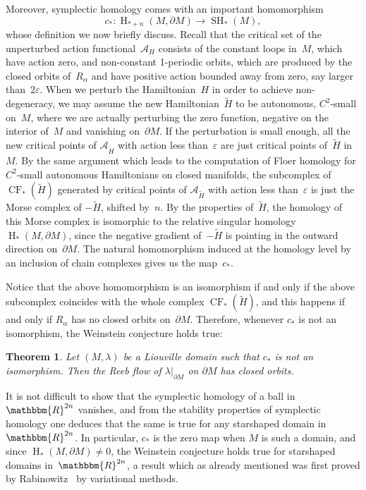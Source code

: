 \documentclass[12pt,twoside]{amsart}
\theoremstyle{plain}
\newtheorem{theorem}{Theorem}[section]
\numberwithin{figure}{section}
\numberwithin{equation}{section}
\def\eps{\varepsilon}
\def\H{\operatorname{H}}
\def\CF{\operatorname{CF}}
\def\SH{\operatorname{SH}}
\def\ca{{\mathcal A}}
\def\RR{\mathbbm{R}}
\begin{document}
Moreover, symplectic homology comes with an important homomorphism
\[
c_* \colon \H_{*+n}(M,\partial M) \rightarrow \SH_*(M),
\]
whose definition we now briefly discuss. Recall that the critical set of the unperturbed action functional~$\ca_H$ consists of the constant loops in~$M$, which have action zero, 
and non-constant 1-periodic orbits, which are produced by the closed orbits of~$R_{\alpha}$ 
and have positive action bounded away from zero, say larger than~$2\eps$. When we perturb the Hamiltonian~$H$ in order to achieve non-degeneracy, we may assume the new Hamiltonian~$\widetilde{H}$ to be autonomous, $C^2$-small on~$M$, 
where we are actually perturbing the zero function, negative on the interior of~$M$ and vanishing on~$\partial M$. If the perturbation is small enough, all the new critical points of $\mathcal{A}_{\widetilde{H}}$ with action less than~$\eps$ 
are just critical points of~$\widetilde{H}$ in~$M$. By the same argument which leads to the computation of 
Floer homology for $C^2$-small autonomous Hamiltonians on closed manifolds, the subcomplex 
of $\CF_*(\widetilde{H})$ generated by critical points of $\mathcal{A}_{\widetilde{H}}$ with action 
less than~$\eps$ is just the Morse complex of $-\widetilde{H}$, shifted by~$n$. 
By the properties of~$\widetilde{H}$, the homology of this Morse complex is isomorphic to the relative singular homology $\H_*(M,\partial M)$, since the negative gradient of~$-\widetilde{H}$ is pointing in the outward direction on~$\partial M$. 
The natural homomorphism induced at the homology level by an inclusion of chain complexes
gives us the map~$c_*$.

Notice that the above homomorphism is an isomorphism if and only if the above subcomplex coincides with the whole complex $\CF_*(\widetilde{H})$, and this happens if and only if 
$R_{\alpha}$ has no closed orbits on~$\partial M$. Therefore, whenever $c_*$ is not an isomorphism, the Weinstein conjecture holds true:

\begin{theorem}
\label{vit}
Let $(M,\lambda)$ be a Liouville domain such that $c_*$ is not an isomorphism. 
Then the Reeb flow of $\lambda|_{\partial M}$ on $\partial M$ has closed orbits.
\end{theorem}

It is not difficult to show that the symplectic homology of a ball in~$\RR^{2n}$ vanishes, 
and from the stability properties of symplectic homology one deduces that the same is true 
for any starshaped domain in~$\RR^{2n}$. In particular, $c_*$ is the zero map when $M$ is such a domain, 
and since $\H_*(M,\partial M) \neq 0$, the Weinstein conjecture holds true for starshaped domains 
in~$\RR^{2n}$, a result which as already mentioned was first proved by Rabinowitz~\cite{Rab78} by variational methods. 
\end{document}
